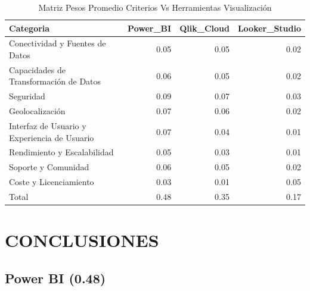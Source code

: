 \documentclass[
  11pt,
  bookmarksnumbered]{article}
\begin{document}
\begin{table}[H]

\caption{\label{tab:unnamed-chunk-55}Matriz Pesos Promedio Criterios Vs Herramientas Visualización}
\centering
\fontsize{12}{14}\selectfont
\begin{tabular}[t]{l|r|r|r}
\hline
Categoria & Power\_BI & Qlik\_Cloud & Looker\_Studio\\
\hline
Conectividad y Fuentes de Datos & 0.05 & 0.05 & 0.02\\
\hline
Capacidades de Transformación de Datos & 0.06 & 0.05 & 0.02\\
\hline
Seguridad & 0.09 & 0.07 & 0.03\\
\hline
Geolocalización & 0.07 & 0.06 & 0.02\\
\hline
Interfaz de Usuario y Experiencia de Usuario & 0.07 & 0.04 & 0.01\\
\hline
Rendimiento y Escalabilidad & 0.05 & 0.03 & 0.01\\
\hline
Soporte y Comunidad & 0.06 & 0.05 & 0.02\\
\hline
Coste y Licenciamiento & 0.03 & 0.01 & 0.05\\
\hline
Total & 0.48 & 0.35 & 0.17\\
\hline
\end{tabular}
\end{table}

\hypertarget{conclusiones}{%
\section{CONCLUSIONES}\label{conclusiones}}

\hypertarget{power-bi-0.48}{%
\subsection{Power BI (0.48)}\label{power-bi-0.48}}
\end{document}
